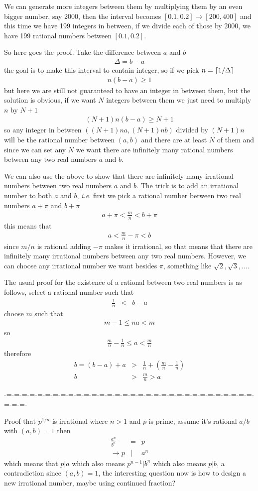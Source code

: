 \documentclass[aps,preprint,preprintnumbers,nofootinbib,showpacs,prd]{revtex4-1}
\newcommand{\ie}{{\it i.e.} }
\newcommand{\nbea}{\begin{eqnarray*}}
\newcommand{\neea}{\end{eqnarray*}}
\DeclarePairedDelimiter{\ceil}{\lceil}{\rceil}
\begin{document}
We can generate more integers between them by multiplying them by an even bigger number, say 2000, then the interval becomes $[0.1,0.2] \to [200, 400]$ and this time we have 199 integers in between, if we divide each of those by 2000, we have 199 rational numbers between $[0.1,0.2]$.

So here goes the proof. Take the difference between $a$ and $b$
%
\nbea
\Delta = b - a
\neea
%
the goal is to make this interval to contain integer, so if we pick $n = \ceil{1/\Delta}$
%
\nbea
n(b-a) \ge 1
\neea
%
but here we are still not guaranteed to have an integer in between them, but the solution is obvious, if we want $N$ integers between them we just need to multiply $n$ by $N+1$
%
\nbea
(N+1)n(b-a) \ge N+1
\neea
%
so any integer in between $((N+1)na,(N+1)nb)$ divided by $(N+1)n$ will be the rational number between $(a,b)$ and there are at least $N$ of them and since we can set any $N$ we want there are infinitely many rational numbers between any two real numbers $a$ and $b$.

We can also use the above to show that there are infinitely many irrational numbers between two real numbers $a$ and $b$. The trick is to add an irrational number to both $a$ and $b$, \ie first we pick a rational number between two real numbers $a + \pi$ and $b + \pi$
%
\nbea
a + \pi < \frac{m}{n} < b+\pi
\neea
%
this means that
%
\nbea
a < \frac{m}{n} - \pi< b
\neea
%
since $m/n$ is rational adding $-\pi$ makes it irrational, so that means that there are infinitely many irrational numbers between any two real numbers. However, we can choose any irrational number we want besides $\pi$, something like $\sqrt{2}, \sqrt{3}, \dots$.

The usual proof for the existence of a rational between two real numbers is as follows, select a rational number such that
%
\nbea
\frac{1}{n} & < & b - a
\neea
%
choose $m$ such that
%
\nbea
m-1 \le na < m
\neea
%
so
%
\nbea
\frac{m}{n} - \frac{1}{n} \le a < \frac{m}{n}
\neea
%
therefore
%
\nbea
b = (b-a) + a & > & \frac{1}{n} + \left(\frac{m}{n} - \frac{1}{n}\right) \\
b & > &\frac{m}{n} > a
\neea
%

-=-=-=-=-=-=-=-=-=-=-=-=-=-=-=-=-=-=-=-=-=-=-=-=-=-=-=-=-=-=-=-=-=-=-=-

Proof that $p^{1/n}$ is irrational where $n > 1$ and $p$ is prime, assume it's rational $a/b$ with $(a,b)=1$ then
%
\nbea
\frac{a^n}{b^n} & = & p \\
\to p & | & a^n
\neea
%
which means that $p|a$ which also means $p^{n-1}|b^n$ which also means $p|b$, a contradiction since $(a,b)=1$, the interesting question now is how to design a new irrational number, maybe using continued fraction?
\end{document}
